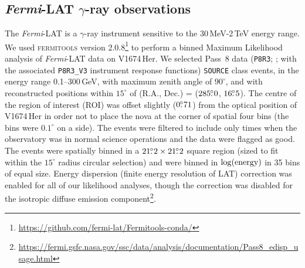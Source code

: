 \documentclass[a4paper,fleqn,usenatbib]{mnras}
\newcommand{\nova}{V1674\,Her}
\newcommand{\fermilat}{\emph{Fermi}-LAT}
\begin{document}



\subsection{\fermilat{} $\gamma$-ray observations}
\label{sec:latobs}

The \fermilat{} \citep{2009ApJ...697.1071A} is a $\gamma$-ray instrument sensitive to the 30\,MeV-2\,TeV energy range.
We used \textsc{fermitools} version 2.0.8\footnote{\url{https://github.com/fermi-lat/Fermitools-conda/}} \citep{2019ascl.soft05011F} to perform a binned Maximum Likelihood analysis \citep{1996ApJ...461..396M} of \fermilat{} data on \nova{}.
We selected Pass~8 data (\texttt{P8R3}; \citealt{2013arXiv1303.3514A,2018arXiv181011394B};
with the associated \texttt{P8R3\_V3} instrument response functions) \texttt{SOURCE} class events,
in the energy range 0.1--300\,GeV, with maximum zenith angle of $90^\circ$, and with reconstructed positions within $15^\circ$ 
of (R.A., Dec.) = ($285\hbox{$.\!\!^\circ$}0$, $16\hbox{$.\!\!^\circ$}5$). The centre of the region of interest (ROI) was offset slightly ($0\hbox{$.\!\!^\circ$}71$) from the optical position of \nova{} 
in order not to place the nova at the corner of spatial four bins (the bins were $0.1^\circ$ on a side). 
The events were filtered to include only times when the observatory was in normal science operations and the data were flagged as good.
The events were spatially binned in a $21\hbox{$.\!\!^\circ$}2\times21\hbox{$.\!\!^\circ$}2$ square region (sized to fit within the $15^\circ$ radius circular selection) and were binned in $\log({\rm energy})$ in 35 bins of equal size.
Energy dispersion (finite energy resolution of LAT) correction was enabled for all of our likelihood analyses, though the correction was disabled for the isotropic diffuse emission component\footnote{\url{https://fermi.gsfc.nasa.gov/ssc/data/analysis/documentation/Pass8_edisp_usage.html}}.
\end{document}
